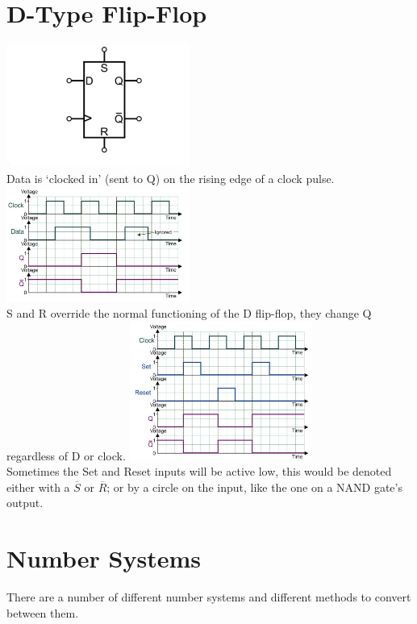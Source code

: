\documentclass[a4paper,11pt, twocolumn]{article}
\begin{document}
\section{D-Type Flip-Flop}
\includegraphics[width=0.45\textwidth]{dLatch.jpg}\\
Data is `clocked in' (sent to Q) on the rising edge of a clock pulse.
\includegraphics[width=0.45\textwidth]{dLatchDataQ.jpg}\\
S and R override the normal functioning of the D flip-flop, they change Q regardless of D or clock.
\includegraphics[width=0.45\textwidth]{dLatchSR.jpg}\\
Sometimes the Set and Reset inputs will be active low, this would be denoted either with a $\overline{S}$ or $\overline{R}$; or by a circle on the input, like the one on a NAND gate's output.

\section{Number Systems}
There are a number of different number systems and different methods to convert between them. 
\end{document}
